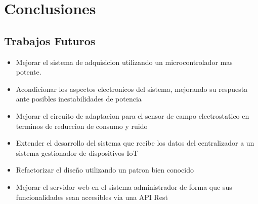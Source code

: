 \chapter{Conclusiones} %
\label{cha:conclusiones}


\section{Trabajos Futuros} %
\label{sec:trabajos_futuros}

\begin{itemize}
	\item Mejorar el sistema de adquisicion utilizando un microcontrolador mas potente.
	\item Acondicionar los aspectos electronicos del sistema, mejorando su respuesta ante posibles inestabilidades de potencia
	\item Mejorar el circuito de adaptacion para el sensor de campo electrostatico en terminos de reduccion de consumo y ruido
	\item Extender el desarrollo del sistema que recibe los datos del centralizador a un sistema gestionador de dispositivos IoT
	\item Refactorizar el diseño utilizando un patron bien conocido
	\item Mejorar el servidor web en el sistema administrador de forma que sus funcionalidades sean accesibles via una API Rest
\end{itemize}



